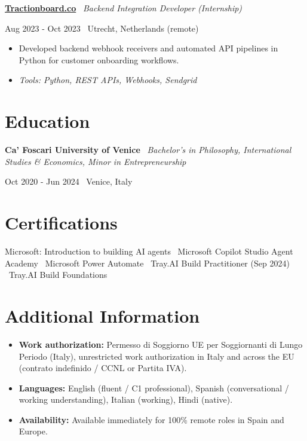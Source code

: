 \documentclass[a4paper,10pt]{article}
\newcommand{\role}[4]{%
  \vspace{2pt}\noindent
  \begin{minipage}[t]{0.70\textwidth}\raggedright\textbf{#1} \textbullet\ \textit{#3}\end{minipage}%
  \hfill
  \begin{minipage}[t]{0.28\textwidth}\raggedleft\footnotesize\color{gray}#2 \textbullet\ #4\end{minipage}%
  \vspace{1pt}%
}
\begin{document}
\role{\href{https://tractionboard.co}{Tractionboard.co}}{Aug 2023 - Oct 2023}{Backend Integration Developer (Internship)}{Utrecht, Netherlands (remote)}
\begin{itemize}
  \item Developed backend webhook receivers and automated API pipelines in Python for customer onboarding workflows.
  \item \textit{Tools: Python, REST APIs, Webhooks, Sendgrid}
\end{itemize}

\section{Education}
\role{Ca' Foscari University of Venice}{Oct 2020 - Jun 2024}{Bachelor's in Philosophy, International Studies \& Economics, Minor in Entrepreneurship}{Venice, Italy}

\section{Certifications}
Microsoft: Introduction to building AI agents \textbullet\ Microsoft Copilot Studio Agent Academy \textbullet\ Microsoft Power Automate \textbullet\ Tray.AI Build Practitioner (Sep 2024) \textbullet\ Tray.AI Build Foundations

\section{Additional Information}
\begin{itemize}
  \item \textbf{Work authorization:} Permesso di Soggiorno UE per Soggiornanti di Lungo Periodo (Italy), unrestricted work authorization in Italy and across the EU (contrato indefinido / CCNL or Partita IVA).
  \item \textbf{Languages:} English (fluent / C1 professional), Spanish (conversational / working understanding), Italian (working), Hindi (native).
  \item \textbf{Availability:} Available immediately for 100\% remote roles in Spain and Europe.
\end{itemize}

\end{document}
